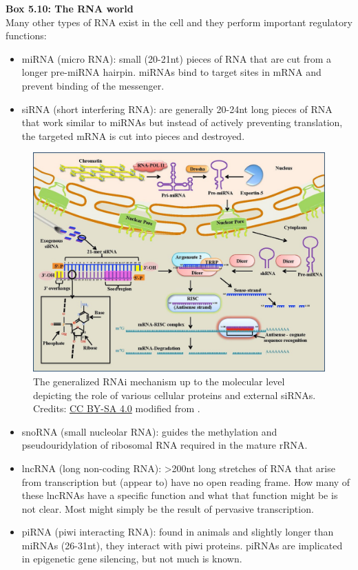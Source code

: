 \begin{framed}
\textbf{Box 5.10: The RNA world}\\
Many other types of RNA exist in the cell and they perform important regulatory functions:

\begin{itemize}
\item miRNA (micro RNA): small (20-21nt) pieces of RNA that are cut from a longer pre-miRNA hairpin.
miRNAs bind to target sites in mRNA and prevent binding of the messenger.
\item siRNA (short interfering RNA): are generally 20-24nt long pieces of RNA that work similar to miRNAs but instead of actively preventing translation, the targeted mRNA is cut into pieces and destroyed.
\end{itemize}

\begin{figure}[!htbp]
\centering
\includegraphics[width=1\linewidth]{files/RNA-types-a2df13784fce13387140a3a6c290b2ab.jpg}
\caption[]{The generalized RNAi mechanism up to the molecular level depicting the role of various cellular proteins and external siRNAs. Credits: \href{https://creativecommons.org/licenses/by-sa/4.0/}{CC BY-SA 4.0} modified from \cite{RNA_types_2016}.}
\label{RNA_types}
\end{figure}

\begin{itemize}
\item snoRNA (small nucleolar RNA): guides the methylation and pseudouridylation of ribosomal RNA required in the mature rRNA.
\item lncRNA (long non-coding RNA): \textgreater 200nt long stretches of RNA that arise from transcription but (appear to) have no open reading frame.
How many of these lncRNAs have a specific function and what that function might be is not clear. Most might simply be the result of pervasive transcription.
\item piRNA (piwi interacting RNA): found in animals and slightly longer than miRNAs (26-31nt), they interact with piwi proteins. piRNAs are implicated in epigenetic gene silencing, but not much is known.
\end{itemize}
\end{framed}

